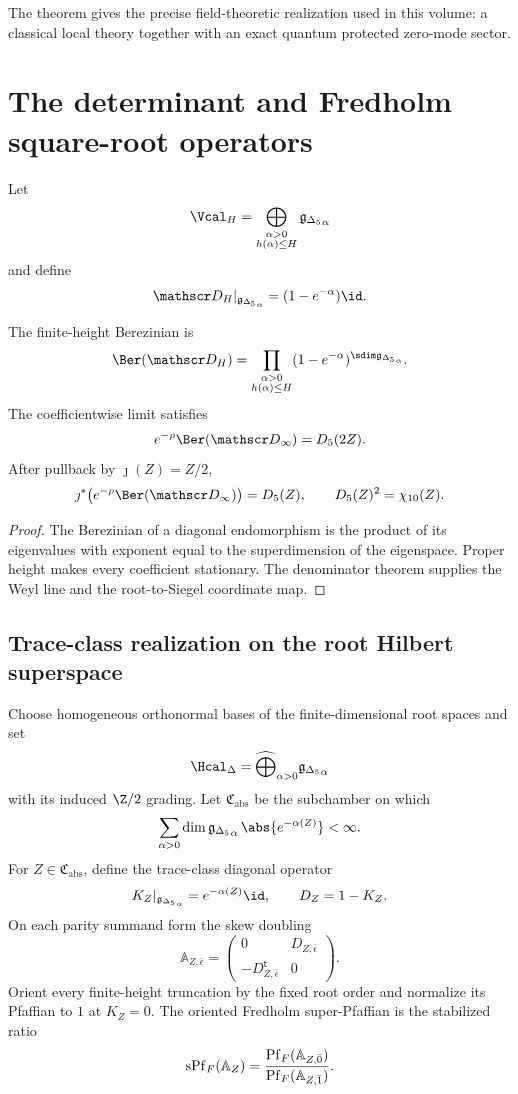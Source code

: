 The theorem gives the precise field-theoretic realization used in this volume: a classical local theory together with an exact quantum protected zero-mode sector.

\chapter{The determinant and Fredholm square-root operators}
Let
\[
 \Vcal_H=\bigoplus_{\substack{\alpha>0\\h(\alpha)\le H}}\gIg_\alpha
\]
and define
\[
 \mathscr D_H|_{\gIg_\alpha}=(1-e^{-\alpha})\id.
\]

\begin{theorem}
The finite-height Berezinian is
\[
 \Ber(\mathscr D_H)
 =\prod_{\substack{\alpha>0\\h(\alpha)\le H}}
 (1-e^{-\alpha})^{\sdim\gIg_\alpha}.
\]
The coefficientwise limit satisfies
\[
 e^{-\rho}\Ber(\mathscr D_\infty)=\Dmon(2Z).
\]
After pullback by $\jmath(Z)=Z/2$,
\[
 \jmath^*\!\left(e^{-\rho}\Ber(\mathscr D_\infty)\right)=\Dmon(Z),
 \qquad \Dmon(Z)^2=\ChiTen(Z).
\]
\end{theorem}
\begin{proof}
The Berezinian of a diagonal endomorphism is the product of its eigenvalues with exponent equal to the superdimension of the eigenspace.  Proper height makes every coefficient stationary.  The denominator theorem supplies the Weyl line and the root-to-Siegel coordinate map.
\end{proof}

\section{Trace-class realization on the root Hilbert superspace}
Choose homogeneous orthonormal bases of the finite-dimensional root spaces and set
\[
 \Hcal_{\Delta}=\widehat\bigoplus_{\alpha>0}\gIg_\alpha
\]
with its induced $\Z/2$ grading.  Let $\mathfrak C_{\mathrm{abs}}$ be the subchamber on which
\[
 \sum_{\alpha>0}\dim\gIg_\alpha\,
       \abs{e^{-\alpha(Z)}}<\infty.
\]
For $Z\in\mathfrak C_{\mathrm{abs}}$, define the trace-class diagonal operator
\[
 K_Z|_{\gIg_\alpha}=e^{-\alpha(Z)}\id,
 \qquad D_Z=1-K_Z.
\]
On each parity summand form the skew doubling
\[
 \mathbb A_{Z,\bar\epsilon}=
 \begin{pmatrix}0&D_{Z,\bar\epsilon}\\-D_{Z,\bar\epsilon}^{\mathsf t}&0\end{pmatrix}.
\]
Orient every finite-height truncation by the fixed root order and normalize its Pfaffian to $1$ at $K_Z=0$.  The oriented Fredholm super-Pfaffian is the stabilized ratio
\[
 \operatorname{sPf}_{F}(\mathbb A_Z)
 =\frac{\operatorname{Pf}_F(\mathbb A_{Z,\bar0})}
        {\operatorname{Pf}_F(\mathbb A_{Z,\bar1})}.
\]

